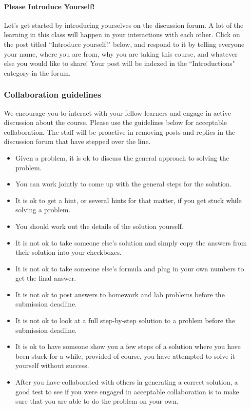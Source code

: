 \documentclass[pdftex, brazil, 12pt, twoside]{article}
\begin{document}
\paragraph{Please Introduce Yourself!} Let's get started by introducing yourselves on the
discussion forum. A lot of the learning in this class will happen in your interactions with
each other. Click on the post titled “Introduce yourself!" below, and respond to it by
telling everyone your name, where you are from, why you are taking this course, and whatever
else you would like to share! Your post will be indexed in the “Introductions"
category in the forum.

\subsubsection{Collaboration guidelines}
\label{ovw0-collab-guide}

We encourage you to interact with your fellow learners and engage in active discussion
about the course. Please use the guidelines below for acceptable collaboration.
The staff will be proactive in removing posts and replies in the discussion forum
that have stepped over the line.

\begin{itemize}[noitemsep]
\item Given a problem, it is ok to discuss the general approach to solving the problem.
\item You can work jointly to come up with the general steps for the solution.
\item It is ok to get a hint, or several hints for that matter, if you get stuck while
  solving a problem.
\item You should work out the details of the solution yourself.
\item It is not ok to take someone else's solution and simply copy the answers
  from their solution into your checkboxes.
\item It is not ok to take someone else's formula and plug in your own numbers
  to get the final answer.
\item It is not ok to post answers to homework and lab problems before the
  submission deadline.
\item It is not ok to look at a full step-by-step solution to a problem before
  the submission deadline.
\item It is ok to have someone show you a few steps of a solution where you have
  been stuck for a while, provided of course, you have attempted to solve it
  yourself without success.
\item After you have collaborated with others in generating a correct solution,
  a good test to see if you were engaged in acceptable collaboration is to make
  sure that you are able to do the problem on your own. 
\end{itemize}
\end{document}
